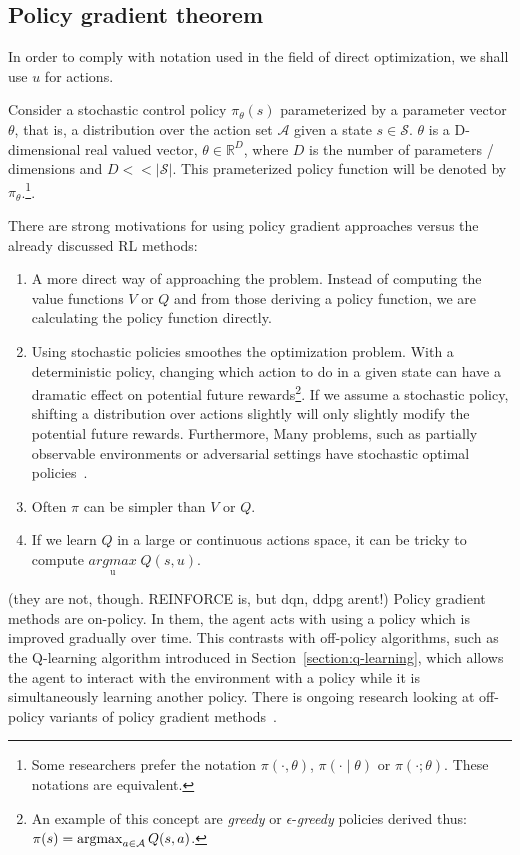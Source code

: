 \documentclass{../main.tex}{subfiles}
\begin{document}
\subsection{Policy gradient theorem}

In order to comply with notation used in the field of direct optimization, we shall use $u$ for actions.

Consider a stochastic control policy  $\pi_{\theta}(s)$ parameterized by a parameter vector $\theta$, that is, a distribution over the action set $\mathcal{A}$ given a state $s \in \mathcal{S}$. $\theta$ is a D-dimensional real valued vector,  $\theta \in \mathbb{R}^{D}$, where $D$ is the number of parameters / dimensions and $D << |\mathcal{S}|$. This prameterized policy function will be denoted by $\pi_{\theta}$.\footnote{Some researchers prefer the notation $\pi(\cdot, \theta)$, $\pi(\cdot \mid \theta)$ or $\pi(\cdot; \theta)$. These notations are equivalent.}. 

There are strong motivations for using policy gradient approaches versus the already discussed RL methods:
\begin{enumerate}
\item A more direct way of approaching the problem. Instead of computing the value functions $V$ or $Q$ and from those deriving a policy function, we are calculating the policy function directly.
\item Using stochastic policies smoothes the optimization problem. With a deterministic policy, changing which action to do in a given state can have a dramatic effect on potential future rewards\footnote{An example of this concept are \textit{greedy} or $\epsilon$-\textit{greedy} policies derived thus: $\pi(s) = \operatorname*{argmax}_{a \in \mathcal{A}} Q(s,a)$.}. If we assume a stochastic policy, shifting a distribution over actions slightly will only slightly modify the potential future rewards. Furthermore, Many problems, such as partially observable environments or adversarial settings have stochastic optimal policies~\citep{Degris2012}.
\item Often $\pi$ can be simpler than $V$ or $Q$.
\item If we learn $Q$ in a large or continuous actions space, it can be tricky to compute $\underset{\text{u}}{argmax}\; Q(s,u)$.
\end{enumerate}
 
(they are not, though. REINFORCE is, but dqn, ddpg arent!) Policy gradient methods are on-policy. In them, the agent acts with using a policy which is improved gradually over time. This contrasts with off-policy algorithms, such as the Q-learning algorithm introduced in Section~\ref{section:q-learning}, which allows the agent to interact with the environment with a policy while it is simultaneously learning another policy. There is ongoing research looking at off-policy variants of policy gradient methods~\citep{Mnih2013, Mnih2016}. 
\end{document}
